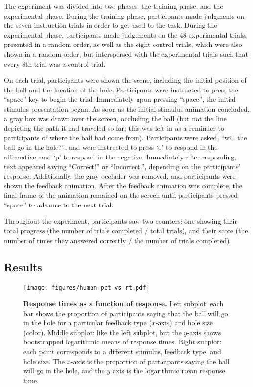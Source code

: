 \documentclass[10pt,letterpaper]{article}
\begin{document}
The experiment was divided into two phases: the training phase, and the experimental phase. During the training phase, participants made judgments on the seven instruction trials in order to get used to the task. During the experimental phase, participants made judgements on the 48 experimental trials, presented in a random order, as well as the eight control trials, which were also shown in a random order, but interspersed with the experimental trials such that every 8th trial was a control trial.

On each trial, participants were shown the scene, including the initial position of the ball and the location of the hole. Participants were instructed to press the ``space'' key to begin the trial. Immediately upon pressing ``space'', the initial stimulus presentation began. As soon as the initial stimulus animation concluded, a gray box was drawn over the screen, occluding the ball (but not the line depicting the path it had traveled so far; this was left in as a reminder to participants of where the ball had come from). Participants were asked, ``will the ball go in the hole?'', and were instructed to press `q' to respond in the affirmative, and `p' to respond in the negative. Immediately after responding, text appeared saying ``Correct!'' or ``Incorrect.'', depending on the participants' response. Additionally, the gray occluder was removed, and participants were shown the feedback animation. After the feedback animation was complete, the final frame of the animation remained on the screen until participants pressed ``space'' to advance to the next trial. 

Throughout the experiment, participants saw two counters: one showing their total progress (the number of trials completed / total trials), and their score (the number of times they answered correctly / the number of trials completed).

\subsection{Results}

\begin{figure}[t]
    \begin{center}
        \texttt{[image: figures/human-pct-vs-rt.pdf]}
        \caption{\textbf{Response times as a function of response.} Left subplot: each bar shows the proportion of participants saying that the ball will go in the hole for a particular feedback type ($x$-axis) and hole size (color). Middle subplot: like the left subplot, but the $y$-axis shows bootstrapped logarithmic means of response times. Right subplot: each point corresponds to a different stimulus, feedback type, and hole size.  The $x$-axis is the proportion of participants saying the ball will go in the hole, and the $y$ axis is the logarithmic mean response time.}
        \label{fig:pct-vs-rt}
    \end{center}
\end{figure}
\end{document}
